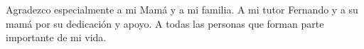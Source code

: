 \begin{acknowledgements}
Agradezco especialmente a mi Mamá y a mi familia. 
A mi tutor Fernando y a su mamá por su dedicación y apoyo.
A todas las personas que forman parte importante de mi vida.         
\end{acknowledgements}